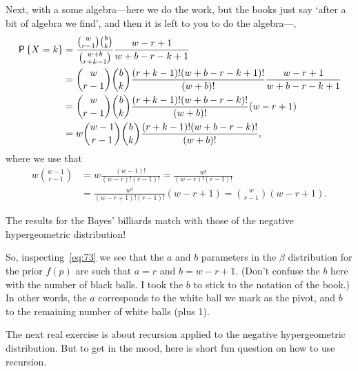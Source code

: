 \documentclass[lectures]{subfiles}
\begin{document}
\begin{exercise}
\begin{solution}
Next, with a some algebra---here we do the work, but the books just say `after a bit of algebra we find', and then it is left to you to do the algebra---,
\begin{align}
\label{eq:717}
\P{X=k}
&= \frac{{w \choose r-1}{b \choose k}}{{w+b \choose r+k -1}}\frac{w-r+1}{w+b-r-k+1} \\
&= {w \choose r-1}{b \choose k} \frac{(r+k-1)!(w+b-r-k+1)!}{(w+b)!}\frac{w-r+1}{w+b-r-k+1} \\
&= {w \choose r-1}{b \choose k} \frac{(r+k-1)!(w+b-r-k)!}{(w+b)!}(w-r+1) \\
&= w {w -1 \choose r-1}{b \choose k} \frac{(r+k-1)!(w+b-r-k)!}{(w+b)!},
\end{align}
where we use that
\begin{align}
  w{w-1 \choose r-1} &= w\frac{ (w-1)!}{(w-r)! (r-1)!} = \frac{ w!}{(w-r)! (r-1)!} \\
&=\frac{ w!}{(w-r+1)! (r-1)!} (w-r+1)= {w\choose r-1} (w-r+1).
\end{align}

The results for the Bayes' billiards match with those of the negative hypergeometric distribution!

So, inspecting~\cref{eq:73} we see that the $a$ and $b$ parameters in the $\beta$ distribution for the prior $f(p)$ are such that $a=r$ and $b=w-r+1$.
(Don't confuse the $b$ here with the number of black balls.
I took the $b$ to stick to the notation of the book.)
In other words, the $a$ corresponds to the white ball we mark as the pivot, and $b$ to the remaining number of white balls (plus 1).
\end{solution}
\end{exercise}

The next real exercise is about recursion applied to the negative hypergeometric distribution. But to get in the mood, here is short fun question on how to use recursion.
\end{document}
